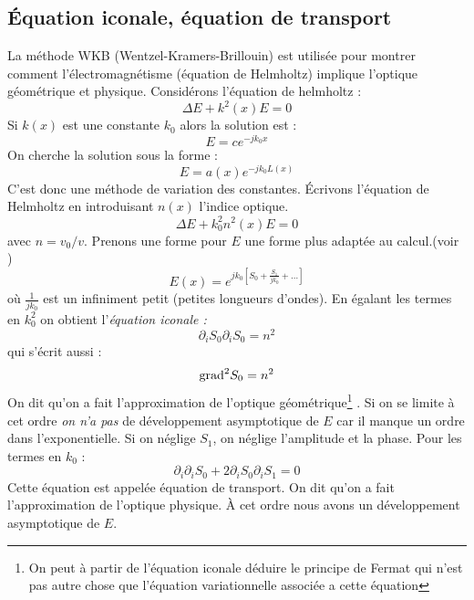 \documentclass[12pt]{book}
\begin{document}
\subsection{\'Equation iconale, \'equation de transport}\label{secWKB}
La m\'ethode WKB (Wentzel-Kramers-Brillouin)
est utilis\'ee pour montrer 
comment l'\'electromagn\'etisme (\'equation de Helmholtz)
implique l'optique g\'eom\'etrique et physique.
Consid\'erons l'\'equation de helmholtz :
\begin{equation}
\Delta E+k^2(x)E=0
\end{equation}
Si $k(x)$ est une constante $k_0$ alors la solution est :
\begin{equation}
E=ce^{-jk_0x}
\end{equation}
On cherche la solution sous la forme :
\begin{equation}
E=a(x)e^{-jk_0L(x)}
\end{equation}
C'est donc une m\'ethode de variation des constantes. \'Ecrivons
l'\'equation de Helmholtz  en
introduisant $n(x)$ l'indice optique. 
\begin{equation}
\Delta E+k_0^2n^2(x)E=0
\end{equation}
avec $n=v_0/v$.
Prenons une forme pour $E$ une forme
plus adapt\'ee au calcul.(voir \cite{ma:equad:Bender87})
\begin{equation}
E(x)=e^{jk_0[S_0+\frac{S_1}{jk_0}+\dots]}
\end{equation}
o\`u $\frac{1}{jk_0}$ est un infiniment petit (petites longueurs
d'ondes).
En \'egalant les termes en $k_0^2$ on obtient l'{\it \'equation iconale
:}
\begin{equation}
\partial_iS_0\partial_iS_0=n^2
\end{equation}
qui s'\'ecrit aussi :
\begin{equation}
{\rm grad}^2S_0=n^2
\end{equation}
On dit qu'on a fait l'approximation de l'optique
g\'eom\'etrique\footnote{%
On peut \`a partir de l'\'equation iconale d\'eduire le principe de Fermat
qui n'est pas autre chose que l'\'equation variationnelle associ\'ee a
cette \'equation}%
. Si on se limite \`a cet ordre {\it on n'a pas } de d\'eveloppement
asymptotique de $E$ car il manque un ordre dans l'exponentielle. Si on
n\'eglige $S_1$, on n\'eglige l'amplitude et la phase. 
Pour les termes en $k_0$ :
\begin{equation}
\partial_i\partial_iS_0+2\partial_iS_0\partial_iS_1=0
\end{equation}
Cette \'equation est appel\'ee \'equation de
transport.  On dit qu'on a
fait 
l'approximation de l'optique physique. \`A cet ordre nous avons un
d\'eveloppement asymptotique de $E$.
\end{document}
